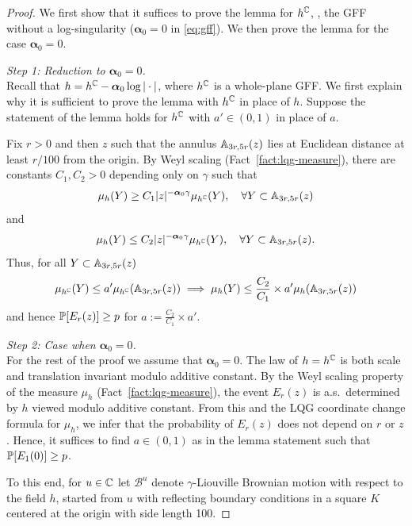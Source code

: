 \documentclass[12pt]{amsart}
\numberwithin{equation}{section}
\begin{document}
	\begin{proof}
		
		
		We first show that it suffices to prove the lemma for $h^{\C}$, \ie, the GFF without a log-singularity ($\boldsymbol{\alpha}_0 = 0$ in \eqref{eq:gff}).
		We then prove the lemma for the case $\boldsymbol{\alpha}_0 = 0$.
		
		{\it Step 1: Reduction to $\boldsymbol{\alpha}_0 = 0$.} \\
		Recall that $h = h^\C -\boldsymbol{\alpha}_0 \log |\cdot|$, where $h^\C$ is a whole-plane GFF. 
		We first explain why it is sufficient to prove the lemma with $h^\C$ in place of $h$. 
		Suppose the statement of the lemma holds for $h^{\C}$ with $a' \in (0,1)$ in place of $a$. 
		
		Fix $r > 0$ and then  $z$ such that the annulus $\A_{3 r, 5 r}(z)$ lies at Euclidean distance at least $r/100$ from the origin. 
		By Weyl scaling (Fact~\ref{fact:lqg-measure}), there are constants $C_1,C_2>  0$ depending only on $\gamma$ such that 
		\begin{equation}
		\mu_h(Y) \geq C_1 |z|^{-\boldsymbol{\alpha}_0 \gamma} \mu_{h^{\C}}(Y), \quad \forall Y \subset \A_{3 r, 5 r}(z)
		\end{equation}
		and
		\begin{equation}
		\mu_h(Y) \leq C_2 |z|^{-\boldsymbol{\alpha}_0 \gamma} \mu_{h^{\C}}(Y), \quad \forall Y \subset \A_{3 r, 5 r}(z) .
		\end{equation} 
		Thus, for all $Y \subset \A_{3 r, 5 r}(z)$
		\[
		\mu_{h^\C}(Y) \leq a' \mu_{h^\C}(\A_{3 r, 5 r}(z)) \implies  \mu_h(Y) \leq \frac{C_2}{C_1} \times a' \mu_{h}(\A_{3 r, 5 r}(z))
		\]
		and hence $\P[E_r(z)] \geq p$ for $a := \frac{C_2}{C_1} \times a'$.
		
		
		{\it Step 2: Case when $\boldsymbol{\alpha}_0 = 0$.} \\
		For the rest of the proof we assume that $\boldsymbol{\alpha}_0 = 0$. The law of $h = h^\C$ is both scale and translation invariant modulo additive constant. By the Weyl scaling property of the measure $\mu_h$ (Fact~\ref{fact:lqg-measure}), the event $E_r(z)$ is a.s.\ determined by $h$ viewed modulo additive constant. From this and the LQG coordinate change formula for $\mu_h$, we infer that the probability of $E_r(z)$ does not depend on $r$ or $z$. Hence, it suffices to find $a  \in (0,1)$ as in the lemma statement such that $\P[E_1(0)] \geq p$. 
		
		To this end, for $u \in \C$ let $\mathcal{B}^u$ denote $\gamma$-Liouville Brownian motion with respect to the field $h$, started from $u$ with 
		reflecting boundary conditions in a square $K$ centered at the origin with side length 100. 
		

\end{proof}
\end{document}
